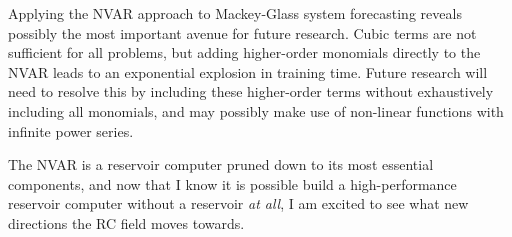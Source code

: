 Applying the NVAR approach to Mackey-Glass system forecasting reveals
possibly the most important avenue for future research. Cubic terms
are not sufficient for all problems, but adding higher-order monomials
directly to the NVAR leads to an exponential explosion in training
time. Future research will need to resolve this by including these
higher-order terms without exhaustively including all monomials, and
may possibly make use of non-linear functions with infinite power
series.

The NVAR is a reservoir computer pruned down to its most essential
components, and now that I know it is possible build a high-performance reservoir computer
without a reservoir \emph{at all}, I am excited to see what new
directions the RC field moves towards.
